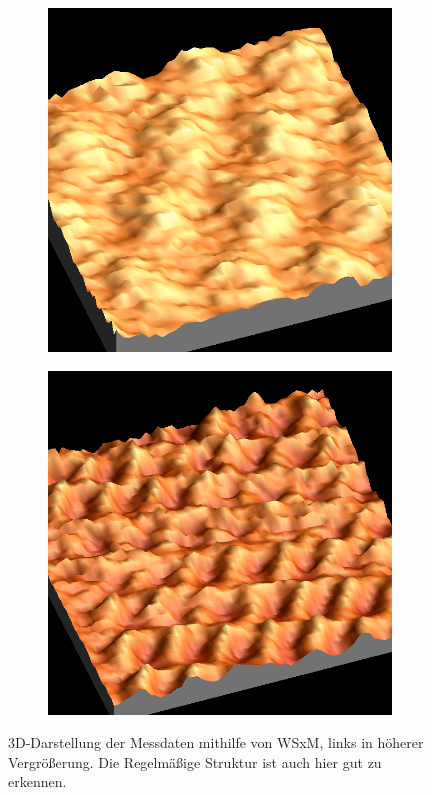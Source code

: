 \begin{figure}[H]
    \begin{subfigure}[c]{0.5\textwidth}
        \centering
        \includegraphics[width=\textwidth]{Mess/graphit3d.png}
    \end{subfigure}
    \begin{subfigure}[c]{0.5\textwidth}
        \includegraphics[width=\textwidth]{Mess/graphit3d2.png}
    \end{subfigure}
    \caption{3D-Darstellung der Messdaten mithilfe von WSxM, links in höherer Vergrößerung. Die Regelmäßige Struktur ist auch hier gut zu erkennen.}
    \label{graphit3d}
\end{figure}

